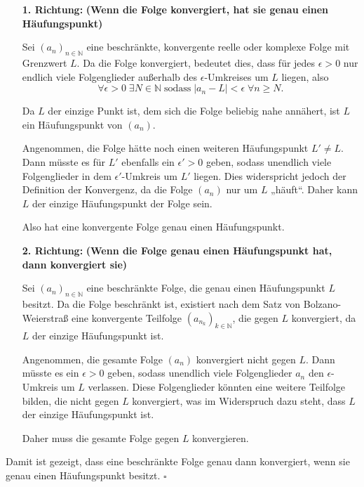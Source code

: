 \documentclass[11pt]{article}
\begin{document}
\begin{enumerate}
    \item[\textbf{1. Richtung:}] \textbf{(Wenn die Folge konvergiert, hat sie genau einen Häufungspunkt)}

    Sei \( (a_n)_{n \in \mathbb{N}} \) eine beschränkte, konvergente reelle oder komplexe Folge mit Grenzwert \( L \). Da die Folge konvergiert, bedeutet dies, dass für jedes \( \epsilon > 0 \) nur endlich viele Folgenglieder außerhalb des \( \epsilon \)-Umkreises um \( L \) liegen, also
    \[
    \forall \epsilon > 0 \; \exists N \in \mathbb{N} \; \text{sodass} \; |a_n - L| < \epsilon \; \forall n \geq N.
    \]

    Da \( L \) der einzige Punkt ist, dem sich die Folge beliebig nahe annähert, ist \( L \) ein Häufungspunkt von \( (a_n) \).

    Angenommen, die Folge hätte noch einen weiteren Häufungspunkt \( L' \neq L \). Dann müsste es für \( L' \) ebenfalls ein \( \epsilon' > 0 \) geben, sodass unendlich viele Folgenglieder in dem \( \epsilon' \)-Umkreis um \( L' \) liegen. Dies widerspricht jedoch der Definition der Konvergenz, da die Folge \( (a_n) \) nur um \( L \) „häuft“. Daher kann \( L \) der einzige Häufungspunkt der Folge sein.

    Also hat eine konvergente Folge genau einen Häufungspunkt.

    \item[\textbf{2. Richtung:}] \textbf{(Wenn die Folge genau einen Häufungspunkt hat, dann konvergiert sie)}

    Sei \( (a_n)_{n \in \mathbb{N}} \) eine beschränkte Folge, die genau einen Häufungspunkt \( L \) besitzt. Da die Folge beschränkt ist, existiert nach dem Satz von Bolzano-Weierstraß eine konvergente Teilfolge \( (a_{n_k})_{k \in \mathbb{N}} \), die gegen \( L \) konvergiert, da \( L \) der einzige Häufungspunkt ist.

    Angenommen, die gesamte Folge \( (a_n) \) konvergiert nicht gegen \( L \). Dann müsste es ein \( \epsilon > 0 \) geben, sodass unendlich viele Folgenglieder \( a_n \) den \( \epsilon \)-Umkreis um \( L \) verlassen. Diese Folgenglieder könnten eine weitere Teilfolge bilden, die nicht gegen \( L \) konvergiert, was im Widerspruch dazu steht, dass \( L \) der einzige Häufungspunkt ist.

    Daher muss die gesamte Folge gegen \( L \) konvergieren.
\end{enumerate}

Damit ist gezeigt, dass eine beschränkte Folge genau dann konvergiert, wenn sie genau einen Häufungspunkt besitzt. \(\square\)
\end{document}
